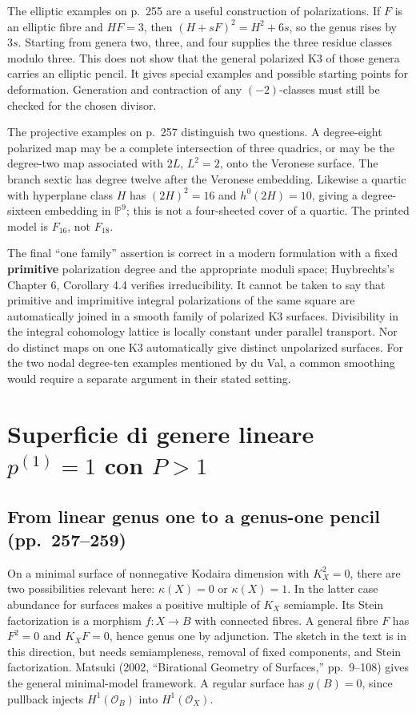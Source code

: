 The elliptic examples on p.~255 are a useful construction of polarizations. If \(F\) is an elliptic fibre and \(H F=3\), then \((H+sF)^2=H^2+6s\), so the genus rises by \(3s\). Starting from genera two, three, and four supplies the three residue classes modulo three. This does not show that the general polarized K3 of those genera carries an elliptic pencil. It gives special examples and possible starting points for deformation. Generation and contraction of any \((-2)\)-classes must still be checked for the chosen divisor.

The projective examples on p.~257 distinguish two questions. A degree-eight polarized map may be a complete intersection of three quadrics, or may be the degree-two map associated with \(2L\), \(L^2=2\), onto the Veronese surface. The branch sextic has degree twelve after the Veronese embedding. Likewise a quartic with hyperplane class \(H\) has \((2H)^2=16\) and \(h^0(2H)=10\), giving a degree-sixteen embedding in \(\mathbb P^9\); this is not a four-sheeted cover of a quartic. The printed model is \(F_{16}\), not \(F_{18}\).

The final ``one family'' assertion is correct in a modern formulation with a fixed \textbf{primitive} polarization degree and the appropriate moduli space; Huybrechts's Chapter 6, Corollary 4.4 verifies irreducibility. It cannot be taken to say that primitive and imprimitive integral polarizations of the same square are automatically joined in a smooth family of polarized K3 surfaces. Divisibility in the integral cohomology lattice is locally constant under parallel transport. Nor do distinct maps on one K3 automatically give distinct unpolarized surfaces. For the two nodal degree-ten examples mentioned by du Val, a common smoothing would require a separate argument in their stated setting.

\section[Superficie di genere lineare uno con bigenere maggiore di uno]{Superficie di genere lineare \texorpdfstring{\(p^{(1)}=1\)}{p(1) = 1} con \texorpdfstring{\(P>1\)}{P > 1}}\label{cp2-vii-4}

\subsection{From linear genus one to a genus-one pencil (pp.~257--259)}\label{cp2-vii-4-1}

On a minimal surface of nonnegative Kodaira dimension with \(K_X^2=0\), there are two possibilities relevant here: \(\kappa(X)=0\) or \(\kappa(X)=1\). In the latter case abundance for surfaces makes a positive multiple of \(K_X\) semiample. Its Stein factorization is a morphism \(f:X\to B\) with connected fibres. A general fibre \(F\) has \(F^2=0\) and \(K_XF=0\), hence genus one by adjunction. The sketch in the text is in this direction, but needs semiampleness, removal of fixed components, and Stein factorization. Matsuki (2002, ``Birational Geometry of Surfaces,'' pp.~9--108) gives the general minimal-model framework. A regular surface has \(g(B)=0\), since pullback injects \(H^1(\mathcal O_B)\) into \(H^1(\mathcal O_X)\).


